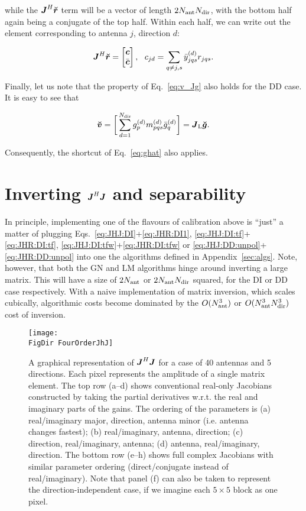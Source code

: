 \documentclass[useAMS,usenatbib]{mn2e}
\makeatletter
\newcommand{\mat}[1]{{\bmath{#1}}}
\newcommand{\JJ}{\mat{J}} %
\newcommand{\JHJ}{\JJ^H\JJ} %
\newcommand{\Matrix}[2]{\left [ \begin{array}{@{}#1@{}}#2\end{array} \right ]}
\newcommand{\AUG}[1]{\bmath{\breve{#1}}}
\newcommand{\Gg}{\AUG{g}}
\newcommand{\Rr}{\AUG{r}}
\newcommand{\Vv}{\AUG{v}}
\newcommand{\LEFT}{\mathrm{L}}
\newcommand{\FigDir}{./}
\makeatother
\begin{document}
while the $\JJ^H\Rr$ term will be a vector of length $2N_\mathrm{ant}N_\mathrm{dir}$, with the bottom half again being
a conjugate of the top half. Within each half, we can write out the element corresponding to 
antenna $j$, direction $d$: 

\begin{equation}
\label{eq:JHR:DD:unpol}
\JJ^H\Rr = \Matrix{c}{\bmath{c}\\\bar{\bmath{c}}},~~c_{jd} = \sum\limits_{q\ne j,s} 
\yydH_{jqs} r_{jqs}.
\end{equation}

Finally, let us note that the property of Eq.~\ref{eq:v_Jg} also holds for the DD case. It is easy to see that

\begin{equation}
\label{eq:v_Jg:dd}
\Vv = \bigg [ \sum_{d=1}^{\Nd} \ggd_p \mmd_{pqs} \ggdH_q \bigg ] = \JJ_\LEFT \Gg.
\end{equation}

Consequently, the shortcut of Eq.~\ref{eq:ghat} also applies.

\section{Inverting $\JJ^H\JJ$ and separability}
\label{sec:separability}

In principle, implementing one of the flavours of calibration above is ``just'' a matter of  
plugging Eqs.~\ref{eq:JHJ:DI}+\ref{eq:JHR:DI1}, \ref{eq:JHJ:DI:tf}+\ref{eq:JHR:DI:tf},
\ref{eq:JHJ:DI:tfw}+\ref{eq:JHR:DI:tfw} or \ref{eq:JHJ:DD:unpol}+\ref{eq:JHR:DD:unpol} into one the algorithms defined in 
Appendix~\ref{sec:algs}. Note, however, that both the GN and LM algorithms hinge around 
inverting a large matrix. This will have a size of $2N_\mathrm{ant}$ or $2N_\mathrm{ant}N_\mathrm{dir}$ squared, 
for the DI or DD case respectively. With a naive implementation of matrix inversion, 
which scales cubically, algorithmic costs become dominated by the $O(N_\mathrm{ant}^3)$ or $O(N_\mathrm{ant}^3N_\mathrm{dir}^3)$
cost of inversion.


\begin{figure*}
\begin{center}
\texttt{[image: \\FigDir FourOrderJhJ]}
\caption{\label{fig:JHJ}A graphical representation of $\JHJ$ for a case of 
40 antennas and 5 directions. Each pixel represents the amplitude of a single matrix element.
The top row (a--d) shows conventional real-only Jacobians constructed by taking the partial derivatives w.r.t. 
the real and imaginary parts of the gains. The ordering of the parameters is (a) real/imaginary major, 
direction, antenna minor (i.e. antenna changes fastest); (b) real/imaginary, antenna, direction; (c) direction, 
real/imaginary, antenna; (d) antenna, real/imaginary, direction. The bottom row (e--h) shows full complex Jacobians with similar parameter ordering (direct/conjugate instead of real/imaginary). Note that panel (f) can also be taken to represent the direction-independent case, if we imagine each $5\times5$ block as one pixel.}
\end{center}
\end{figure*}
\end{document}
